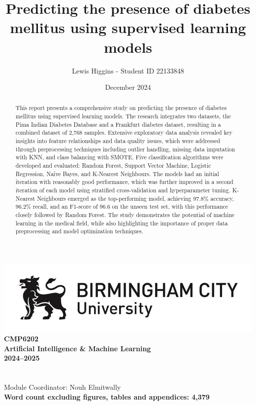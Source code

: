 \documentclass[12pt]{report}
\title{Predicting the presence of diabetes mellitus using supervised learning models}
\author{Lewis Higgins - Student ID 22133848}
\date{December 2024}
\begin{document}
\makeatletter
\begin{titlepage}
    \begin{center}
        \includegraphics[width=.8\linewidth]{BCU-Long.jpg}\\[4ex]
        {\huge \bfseries CMP6202}\\[4ex]
        {\huge \bfseries Artificial Intelligence \& Machine Learning}\\[4ex]
        {\huge \bfseries 2024–2025}\\[16ex]
        {\huge \bfseries  \@title}\\[35ex]
        {\@author}\\[2ex]
        {Module Coordinator: Nouh Elmitwally}\\[2ex]
        {\bfseries Word count excluding figures, tables and appendices: 4,379}\\[10ex]
    \end{center}
\end{titlepage}
\makeatother
\thispagestyle{empty}
\newpage


\setcounter{page}{0}


\tableofcontents
\thispagestyle{empty}

\begin{abstract}
    This report presents a comprehensive study on predicting the presence of diabetes mellitus using supervised learning models. 
    The research integrates two datasets, the Pima Indian Diabetes Database and a Frankfurt diabetes dataset, resulting in a combined dataset of
    2,768 samples. Extensive exploratory data analysis revealed key insights into feature relationships and data quality issues, which were 
    addressed through preprocessing techniques including outlier handling, missing data imputation with KNN, and class balancing with SMOTE. 
    Five classification algorithms were developed and evaluated: Random Forest, Support Vector Machine, Logistic Regression, Naïve Bayes, and K-Nearest Neighbours.
    The models had an initial iteration with reasonably good performance, which was further improved in a second iteration of each model using stratified cross-validation
    and hyperparameter tuning. K-Nearest Neighbours emerged as the top-performing model, achieving 97.8\% accuracy, 96.2\% recall, and an F1-score of 96.6 on the unseen test set,
    with this performance closely followed by Random Forest. The study demonstrates the potential of machine learning in the medical field, while also highlighting the 
    importance of proper data preprocessing and model optimization techniques. 
\end{abstract}
\end{document}
